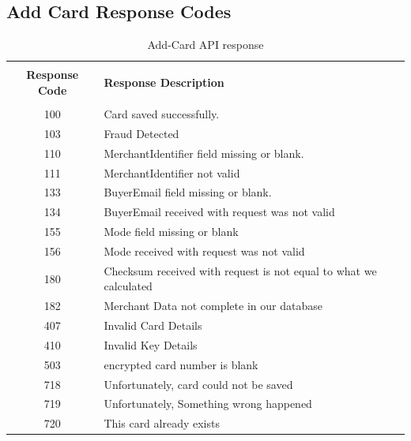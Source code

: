 \documentclass{article}
\begin{document}
\subsection{Add Card Response Codes }
\begin{longtable}{||c|p{12.5cm}||}
   \rowcolor{white}
   \caption{Add-Card API response}\\
   \rowcolor{green!50}
\bfseries{Response Code} & \bfseries{Response Description} \\ \hline  & \\
100 & Card saved successfully.  \\
103 & Fraud Detected  \\
110 & MerchantIdentifier field missing or blank.  \\
111 & MerchantIdentifier not valid  \\
133 & BuyerEmail field missing or blank.  \\
134 & BuyerEmail received with request was not valid  \\
155 & Mode field missing or blank  \\
156 & Mode received with request was not valid  \\
180 & Checksum received with request is not equal to what we calculated  \\
182 & Merchant Data not complete in our database  \\
407 & Invalid Card Details  \\
410 & Invalid Key Details  \\
503 & encrypted card number is blank  \\
718 & Unfortunately, card could not be saved  \\
719 & Unfortunately, Something wrong happened  \\
720 & This card already exists  \\

\end{longtable}
\newpage
\end{document}
